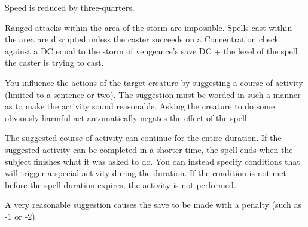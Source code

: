\begin{multicols}{2}
\begin{small}

\smallskip\noindent Speed is reduced by three-quarters.

\smallskip\noindent Ranged attacks within the area of the storm are impossible. Spells cast within the area are disrupted unless the caster succeeds on a Concentration check against a DC equal to the storm of vengeance's save DC + the level of the spell the caster is trying to cast.

\noindent You influence the actions of the target creature by suggesting a course of activity (limited to a sentence or two). The suggestion must be worded in such a manner as to make the activity sound reasonable. Asking the creature to do some obviously harmful act automatically negates the effect of the spell. 

\smallskip\noindent The suggested course of activity can continue for the entire duration. If the suggested activity can be completed in a shorter time, the spell ends when the subject finishes what it was asked to do. You can instead specify conditions that will trigger a special activity during the duration. If the condition is not met before the spell duration expires, the activity is not performed.

\smallskip\noindent A very reasonable suggestion causes the save to be made with a penalty (such as -1 or -2).


\end{small}
\end{multicols}
